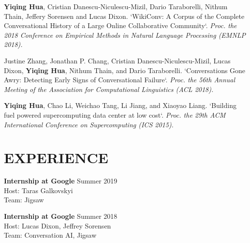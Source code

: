 \documentclass[margin, 10pt]{res} %
\begin{document}
\begin{resume}
\textbf{Yiqing Hua}, Cristian Danescu-Niculescu-Mizil, Dario Taraborelli, Nithum Thain, Jeffery Sorensen and Lucas Dixon.
`WikiConv: A Corpus of the Complete Conversational History of a Large Online Collaborative Community`.
\textit{Proc. the 2018 Conference on Empirical Methods in Natural Language Processing (EMNLP 2018).}

Justine Zhang, Jonathan P. Chang, Cristian Danescu-Niculescu-Mizil, Lucas Dixon, \textbf{Yiqing Hua}, Nithum Thain, and Dario Taraborelli.
`Conversations Gone Awry: Detecting Early Signs of Conversational Failure`.
\textit{Proc. the 56th Annual Meeting of the Association for Computational Linguistics (ACL 2018).}

\textbf{Yiqing Hua}, Chao Li, Weichao Tang, Li Jiang, and Xiaoyao Liang.
`Building fuel powered supercomputing data center at low cost`.
\textit{Proc. the 29th ACM International Conference on Supercomputing (ICS 2015).}

\section{EXPERIENCE}
\textbf{Internship at Google} \hfill Summer 2019\\
Host: Taras Galkovskyi\\
Team: Jigsaw

\textbf{Internship at Google} \hfill Summer 2018\\
Host: Lucas Dixon, Jeffrey Sorensen\\
Team: Conversation AI, Jigsaw



\end{resume}
\end{document}
